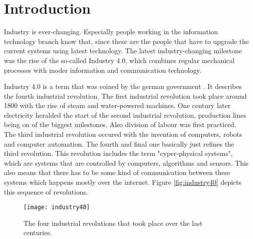 \chapter{Introduction}
\label{ch:Introduction}




Industry is ever-changing. Especially people working in the information technology branch know that, since these are the people that have to upgrade the current systems using latest technology. The latest industry-changing milestone was the rise of the so-called Industry 4.0, which combines regular mechanical processes with moder information and communication technology.

Industry 4.0 is a term that was coined by the german government \cite{Industrie4.0Paper}. It describes the fourth industrial revolution. The first industrial revolution took place around 1800 with the rise of steam and water-powered machines. One century later electricity heralded the start of the second industrial revolution, production lines being on of the biggest milestones. Also division of labour was first practiced. The third industrial revolution occured with the invention of computers, robots and computer automation. The fourth and final one basically just refines the third revolution. This revolution includes the term "cyper-physical systems", which are systems that are controlled by computers, algorithms and sensors. This also means that there has to be some kind of communication between these systems which happens mostly over the internet. Figure \vref{fig:industry40} depicts this sequence of revolutions.


\begin{figure}[H]
    \centering
    \texttt{[image: industry40]}
    \caption{The four industrial revolutions that took place over the last centuries. \cite{img:industry4.0}}
    \label{fig:industry40}
\end{figure}

